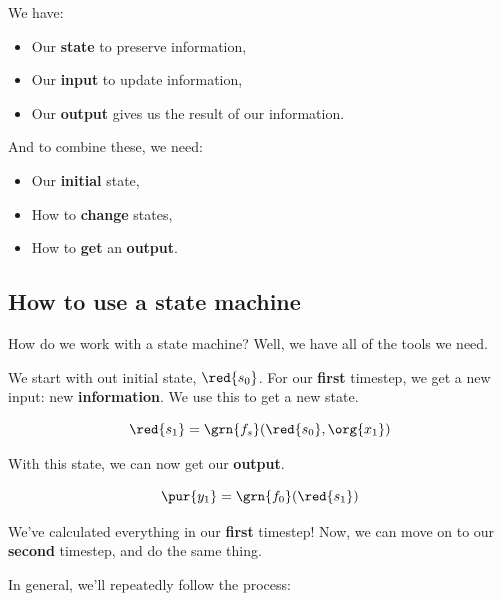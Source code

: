         We have:
        
        \begin{itemize}
            \item Our \textbf{state} to preserve information,
            \item Our \textbf{input} to update information,
            \item Our \textbf{output} gives us the result of our information.
        \end{itemize}
        
        And to combine these, we need:
        
        \begin{itemize}
            \item Our \textbf{initial} state,
            \item How to \textbf{change} states,
            \item How to \textbf{get} an \textbf{output}.
        \end{itemize}
    
    \secdiv
    
    \subsection{How to use a state machine}
    
        How do we work with a state machine? Well, we have all of the tools we need.
        
        We start with out initial state, $\red{s_0}$. For our \textbf{first} timestep, we get a new input: new \textbf{information}. We use this to get a new state.
        
        \begin{equation}
            \red{s_1} = 
            \grn{f_s}(\red{s_0}, \org{x_1})
        \end{equation}
        
        With this state, we can now get our \textbf{output}.
        
        \begin{equation}
            \pur{y_1} = 
            \grn{f_0}(\red{s_1})
        \end{equation}
        
        We've calculated everything in our \textbf{first} timestep! Now, we can move on to our \textbf{second} timestep, and do the same thing.
        
        In general, we'll repeatedly follow the process:
        
